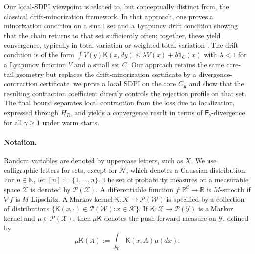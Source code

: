 \documentclass[10pt, journal]{IEEEtran}
\newcommand{\sK}{\mathsf{K}}
\begin{document}
Our local-SDPI viewpoint is related to, but conceptually distinct from, the classical drift-minorization framework. In that approach, one proves a minorization condition on a small set and a Lyapunov drift condition showing that the chain returns to that set sufficiently often; together, these yield convergence, typically in total variation or weighted total variation \cite{harris1956existence,nummelin1984general,meyn2009markov,rosenthal1995minorization,hairer2011yet}. The drift condition is of the form $\int V(y)\sK(x,dy)\le \lambda V(x)+b\mathbf 1_C(x)$ with $\lambda<1$ for a Lyapunov function $V$ and a small set $C$.
Our approach retains the same core-tail geometry but replaces the drift-minorization certificate by a divergence-contraction certificate: we prove a local SDPI on the core $C_R$ and show that the resulting contraction coefficient directly controls the rejection profile on that set. The final bound separates local contraction from the loss due to localization, expressed through $H_R$, and yields a convergence result in terms of $\mathsf E_\gamma$-divergence for all $\gamma\geq 1$ under warm starts. 

\paragraph{Notation.} Random variables are denoted by uppercase letters, such as $X$. We use calligraphic letters for sets, except for $\mathcal N$, which denotes a Gaussian distribution. For $n\in\mathbb N$, let $[n]:=\{1,\ldots,n\}$. The set of probability measures on a measurable space $\mathcal X$ is denoted by $\mathcal P(\mathcal X)$. A differentiable function $f:\mathbb R^d\to\mathbb R$ is $M$-smooth if $\nabla f$ is $M$-Lipschitz.  A Markov kernel $\mathsf{K}:\mathcal{K}\to\mathcal{P}(\mathcal{W})$ is specified by a collection of distributions $\{\mathsf{K}(x, \cdot)\in\mathcal{P}(\mathcal{W}):x\in\mathcal{K}\}$.  If $\sK:\mathcal X\to\mathcal P(\mathcal Y)$ is a Markov kernel and $\mu\in\mathcal P(\mathcal X)$, then $\mu\sK$ denotes the push-forward measure on $\mathcal Y$, defined by $$\mu\sK(A):=\int_{\mathcal X}\sK(x,A)\mu(dx).$$ 
\end{document}
